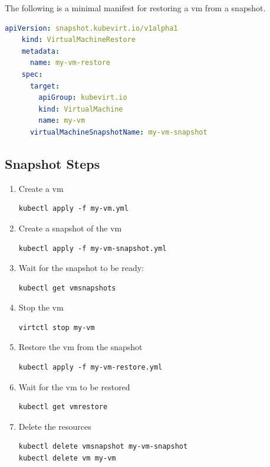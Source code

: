 \documentclass{kththesis}
\begin{document}
\begin{enumerate}
\noindent The following is a minimal manifest for restoring a \Gls{vm} from a snapshot.
\begin{lstlisting}[language=yaml]
    apiVersion: snapshot.kubevirt.io/v1alpha1
    kind: VirtualMachineRestore
    metadata:
      name: my-vm-restore
    spec:
      target:
        apiGroup: kubevirt.io
        kind: VirtualMachine
        name: my-vm
      virtualMachineSnapshotName: my-vm-snapshot
\end{lstlisting}

\subsection*{Snapshot Steps}
\begin{enumerate}
    \item Create a \Gls{vm}
\begin{lstlisting}
kubectl apply -f my-vm.yml
\end{lstlisting}

    \item Create a snapshot of the \Gls{vm}
\begin{lstlisting}
kubectl apply -f my-vm-snapshot.yml
\end{lstlisting}

    \item Wait for the snapshot to be ready:
\begin{lstlisting}
kubectl get vmsnapshots
\end{lstlisting}

    \item Stop the \Gls{vm}
\begin{lstlisting}
virtctl stop my-vm
\end{lstlisting}

    \item Restore the \Gls{vm} from the snapshot
\begin{lstlisting}
kubectl apply -f my-vm-restore.yml
\end{lstlisting}

    \item Wait for the \Gls{vm} to be restored
\begin{lstlisting}
kubectl get vmrestore
\end{lstlisting}

    \item Delete the resources
\begin{lstlisting}
kubectl delete vmsnapshot my-vm-snapshot
kubectl delete vm my-vm
\end{lstlisting}
\end{enumerate}


\end{enumerate}
\end{document}
